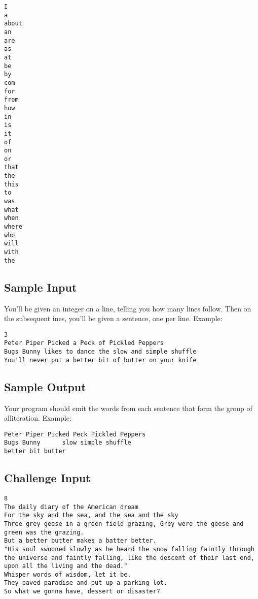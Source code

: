 \begin{lstlisting}
I 
a 
about 
an 
are 
as 
at 
be 
by 
com 
for 
from
how
in 
is 
it 
of 
on 
or 
that
the 
this
to 
was 
what 
when
where
who 
will 
with
the
\end{lstlisting}

\subsection*{Sample Input}\label{sample-input}

You'll be given an integer on a line, telling you how many lines follow.
Then on the subsequent ines, you'll be given a sentence, one per line.
Example:

\begin{lstlisting}
3
Peter Piper Picked a Peck of Pickled Peppers
Bugs Bunny likes to dance the slow and simple shuffle
You'll never put a better bit of butter on your knife
\end{lstlisting}

\subsection*{Sample Output}\label{sample-output}

Your program should emit the words from each sentence that form the
group of alliteration. Example:

\begin{lstlisting}
Peter Piper Picked Peck Pickled Peppers
Bugs Bunny      slow simple shuffle
better bit butter
\end{lstlisting}

\subsection*{Challenge Input}\label{challenge-input-9}

\begin{lstlisting}
8
The daily diary of the American dream
For the sky and the sea, and the sea and the sky
Three grey geese in a green field grazing, Grey were the geese and green was the grazing.
But a better butter makes a batter better.
"His soul swooned slowly as he heard the snow falling faintly through the universe and faintly falling, like the descent of their last end, upon all the living and the dead."
Whisper words of wisdom, let it be.
They paved paradise and put up a parking lot.
So what we gonna have, dessert or disaster?
\end{lstlisting}


